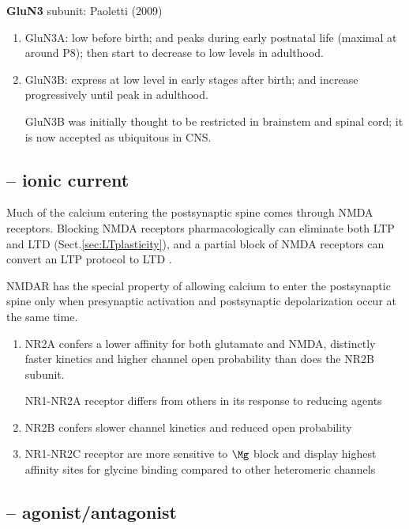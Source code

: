 {\bf GluN3} subunit: Paoletti (2009)
\begin{enumerate}
  \item GluN3A: low before birth; and peaks during early postnatal life (maximal
  at around P8); then start to decrease to low levels in adulthood.
  
  \item GluN3B: express at low level in early stages after birth; and increase
  progressively until peak in adulthood.
  
  GluN3B was initially thought to be restricted in brainstem and spinal cord; it
  is now accepted as ubiquitous in CNS.
  
\end{enumerate}

\subsection{-- ionic current}

Much of the calcium entering the postsynaptic spine comes through NMDA
receptors. Blocking NMDA receptors pharmacologically can eliminate both LTP and
LTD (Sect.\ref{sec:LTplasticity}), and a partial block of NMDA receptors can
convert an LTP protocol to LTD \citep{blanke2009}.

NMDAR has the special property of allowing calcium to enter the postsynaptic
spine only when presynaptic activation and postsynaptic depolarization occur at
the same time.

\begin{enumerate}  
  \item NR2A  confers a lower affinity for both glutamate and NMDA, distinctly faster
kinetics and higher channel open probability than does the NR2B subunit.

NR1-NR2A receptor differs from others in its response to reducing agents
  
  \item NR2B confers slower channel kinetics and reduced open probability
    
  \item NR1-NR2C receptor are more sensitive to $\Mg$ block and display highest affinity
sites for glycine binding compared to other heteromeric channels
    

\end{enumerate}
 
\subsection{-- agonist/antagonist}
\label{sec:NMDAR-antagonist}

